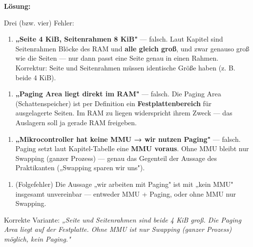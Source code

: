 \documentclass[11pt, a4paper]{article}
\begin{document}
\textbf{Lösung:}


Drei (bzw. vier) Fehler:


\begin{enumerate}
  \item \textbf{„Seite 4 KiB, Seitenrahmen 8 KiB"} — falsch. Laut Kapitel sind Seitenrahmen Blöcke des RAM und \textbf{alle gleich groß}, und zwar genauso groß wie die Seiten — nur dann passt eine Seite genau in einen Rahmen. Korrektur: Seite und Seitenrahmen müssen identische Größe haben (z. B. beide 4 KiB).
\end{enumerate}

\begin{enumerate}
  \item \textbf{„Paging Area liegt direkt im RAM"} — falsch. Die Paging Area (Schattenspeicher) ist per Definition ein \textbf{Festplattenbereich} für ausgelagerte Seiten. Im RAM zu liegen widerspricht ihrem Zweck — das Auslagern soll ja gerade RAM freigeben.
\end{enumerate}

\begin{enumerate}
  \item \textbf{„Mikrocontroller hat keine MMU → wir nutzen Paging"} — falsch. Paging setzt laut Kapitel-Tabelle eine \textbf{MMU voraus}. Ohne MMU bleibt nur Swapping (ganzer Prozess) — genau das Gegenteil der Aussage des Praktikanten („Swapping sparen wir uns").
\end{enumerate}

\begin{enumerate}
  \item (Folgefehler) Die Aussage „wir arbeiten mit Paging" ist mit „kein MMU" insgesamt unvereinbar — entweder MMU + Paging, oder ohne MMU nur Swapping.
\end{enumerate}

Korrekte Variante: \textit{„Seite und Seitenrahmen sind beide 4 KiB groß. Die Paging Area liegt auf der Festplatte. Ohne MMU ist nur Swapping (ganzer Prozess) möglich, kein Paging."}





\end{document}
